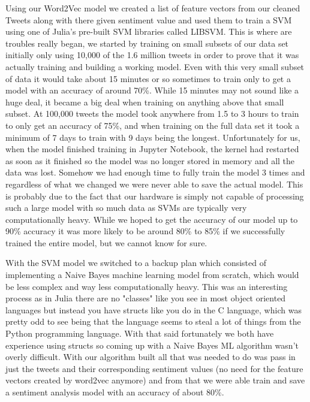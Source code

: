 \documentclass{article}
\begin{document}
Using our Word2Vec model we created a list of feature vectors from our cleaned Tweets along with there given sentiment value and used them to train a SVM using one of Julia's pre-built SVM libraries called LIBSVM. This is where are troubles really began, we started by training on small subsets of our data set initially only using 10,000 of the 1.6 million tweets in order to prove that it was actually training and building a working model. Even with this very small subset of data it would take about 15 minutes or so sometimes to train only to get a model with an accuracy of around 70\%. While 15 minutes may not sound like a huge deal, it became a big deal when training on anything above that small subset. At 100,000 tweets the model took anywhere from 1.5 to 3 hours to train to only get an accuracy of 75\%, and when training on the full data set it took a minimum of 7 days to train with 9 days being the longest. Unfortunately for us, when the model finished training in Jupyter Notebook, the kernel had restarted as soon as it finished so the model was no longer stored in memory and all the data was lost. Somehow we had enough time to fully train the model 3 times and regardless of what we changed we were never able to save the actual model. This is probably due to the fact that our hardware is simply not capable of processing such a large model with so much data as SVMs are typically very computationally heavy. While we hoped to get the accuracy of our model up to 90\% accuracy it was more likely to be around 80\% to 85\% if we successfully trained the entire model, but we cannot know for sure.

With the SVM model  we switched to a backup plan which consisted of implementing a Naive Bayes machine learning model from scratch, which would be less complex and way less computationally heavy. This was an interesting process as in Julia there are no "classes" like you see in most object oriented languages but instead you have structs like you do in the C language, which was pretty odd to see being that the language seems to steal a lot of things from the Python programming language. With that said fortunately we both have experience using structs so coming up with a Naive Bayes ML algorithm wasn't overly difficult. With our algorithm built all that was needed to do was pass in just the tweets and their corresponding sentiment values (no need for the feature vectors created by word2vec anymore) and from that we were able train and save a sentiment analysis model with an accuracy of about 80\%.
\end{document}
